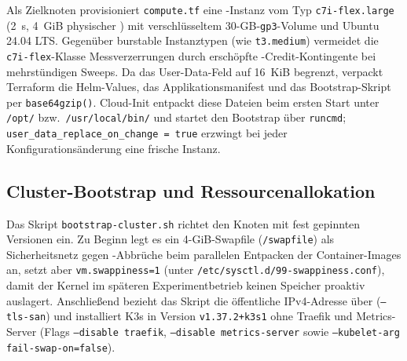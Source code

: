 Als Zielknoten provisioniert \texttt{compute.tf} eine -Instanz vom Typ \texttt{c7i-flex.large} (2~s, 4~GiB physischer ) mit verschlüsseltem 30-GB-\texttt{gp3}-Volume und Ubuntu 24.04 LTS. Gegenüber burstable Instanztypen (wie \texttt{t3.medium}) vermeidet die \texttt{c7i-flex}-Klasse Messverzerrungen durch erschöpfte -Credit-Kontingente bei mehrstündigen Sweeps. Da  das User-Data-Feld auf 16~KiB begrenzt,\autocite{aws_userdata_2026} verpackt Terraform die Helm-Values, das Applikationsmanifest und das Bootstrap-Skript per \texttt{base64gzip()}. Cloud-Init entpackt diese Dateien beim ersten Start unter \texttt{/opt/} bzw.\ \texttt{/usr/local/bin/} und startet den Bootstrap über \texttt{runcmd}; \texttt{user\_data\_replace\_on\_change = true} erzwingt bei jeder Konfigurationsänderung eine frische Instanz.\autocites[Kap.~2]{brikman_terraform_2022}{cloudinit_docs_2026}

\subsection{Cluster-Bootstrap und Ressourcenallokation}
\label{subsec:cluster-bootstrap-ressourcenallokation}

Das Skript \texttt{bootstrap-cluster.sh} richtet den Knoten mit fest gepinnten Versionen ein. Zu Beginn legt es ein 4-GiB-Swapfile (\texttt{/swapfile}) als Sicherheitsnetz gegen -Abbrüche beim parallelen Entpacken der Container-Images an, setzt aber \texttt{vm.swappiness=1} (unter \texttt{/etc/\allowbreak{}sysctl.d/\allowbreak{}99-swappiness.conf}), damit der Kernel im späteren Experimentbetrieb keinen Speicher proaktiv auslagert.\autocite[Abschn.~7.6]{gregg_systems_2020} Anschließend bezieht das Skript die öffentliche IPv4-Adresse über  (\texttt{--tls-san}) und installiert K3s in Version \texttt{v1.37.2+k3s1} ohne Traefik und Metrics-Server (Flags \texttt{--disable traefik}, \texttt{--disable metrics-server} sowie \texttt{--kubelet-arg fail-swap-on=false}).\autocite{aws_imds_2026,k3s_architecture_2026}

